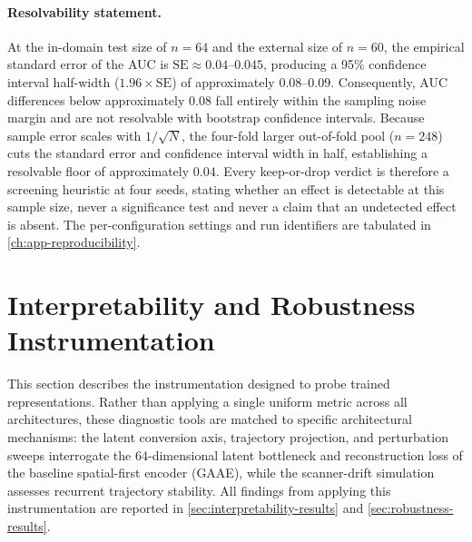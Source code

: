 \paragraph{Resolvability statement.}
At the in-domain test size of $n = 64$ and the external size of $n = 60$, the empirical standard error of the \ac{AUC} is $\text{SE} \approx 0.04\text{--}0.045$, producing a 95\% confidence interval half-width ($1.96 \times \text{SE}$) of approximately $0.08\text{--}0.09$. Consequently, \ac{AUC} differences below approximately $0.08$ fall entirely within the sampling noise margin and are not resolvable with bootstrap confidence intervals. Because sample error scales with $1/\sqrt{N}$, the four-fold larger out-of-fold pool ($n = 248$) cuts the standard error and confidence interval width in half, establishing a resolvable floor of approximately $0.04$. Every keep-or-drop verdict is therefore a screening heuristic at four seeds, stating whether an effect is detectable at this sample size, never a significance test and never a claim that an undetected effect is absent. The per-configuration settings and run identifiers are tabulated in \autoref{ch:app-reproducibility}.

\section{Interpretability and Robustness Instrumentation}\label{sec:instrumentation}

This section describes the instrumentation designed to probe trained representations. Rather than applying a single uniform metric across all architectures, these diagnostic tools are matched to specific architectural mechanisms: the latent conversion axis, trajectory projection, and perturbation sweeps interrogate the 64-dimensional latent bottleneck and reconstruction loss of the baseline spatial-first encoder (\ac{GAAE}), while the scanner-drift simulation assesses recurrent trajectory stability. All findings from applying this instrumentation are reported in \autoref{sec:interpretability-results} and \autoref{sec:robustness-results}.

